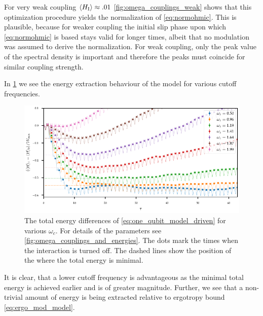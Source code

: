 For very weak coupling \(\ev{H_{\inter}}\approx .01\)
\cref{fig:omega_couplings_weak} shows that this optimization procedure
yields the normalization of \cref{eq:normohmic}. This is plausible,
because for weaker coupling the initial slip phase upon which
\cref{eq:normohmic} is based stays valid for longer times, albeit that no
modulation was assumed to derive the normalization. For weak coupling,
only the peak value of the spectral density is important and therefore
the peaks must coincide for similar coupling strength.

In \cref{fig:omegas_total} we see the energy extraction behaviour of
the model for various cutoff frequencies.
\begin{figure}[h]
  \centering
  \includegraphics{figs/one_bath_mod/omegas_total}
  \caption{\label{fig:omegas_total} The total energy differences of
    \cref{eq:one_qubit_model_driven} for various \(ω_{c}\). For
    details of the parameters see
    \cref{fig:omega_couplings_and_energies}. The dots mark the times
    when the interaction is turned off.  The dashed lines show the
    position of the where the total energy is minimal.}
\end{figure}
It is clear, that a lower cutoff frequency is advantageous as the
minimal total energy is achieved earlier and is of greater
magnitude. Further, we see that a non-trivial amount of energy is
being extracted relative to ergotropy bound \cref{eq:ergo_mod_model}.

